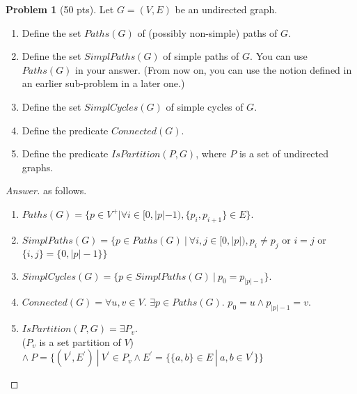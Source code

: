 \documentclass[11pt,a4paper,oneside,microtype,nokorean]{oblivoir}
\theoremstyle{definition}
\newtheorem{problem}{Problem}
\begin{document}
\begin{problem}[50 pts]
  Let $G = (V,E)$ be an undirected graph.

  \begin{enumerate}
  \item Define the set $Paths(G)$ of (possibly non-simple) paths of $G$.
  \item Define the set $SimplPaths(G)$ of simple paths of $G$.  You can use $Paths(G)$ in your
    answer.  (From now on, you can use the notion defined in an earlier sub-problem in a later one.)
  \item Define the set $SimplCycles(G)$ of simple cycles of $G$.
  \item Define the predicate $Connected(G)$.
  \item Define the predicate $IsPartition(P, G)$, where $P$ is a set of undirected graphs.
  \end{enumerate}
\end{problem}
\begin{proof}[Answer] as follows.

  \begin{enumerate}
  \item $Paths(G) = \{p \in V^+ | \forall i \in [0, |p| -1), \{p_i, p_{i+1}\} \in E \}.$
  \item $SimplPaths(G) = \{p \in Paths(G)\ |\ \forall{i,j} \in [0,|p|), p_i \neq p_j$ or $i=j$ or $\{i,j\} = \{0, |p|-1\}\}$
  \item $SimplCycles(G) = \{p \in SimplPaths(G)\ |\ p_0 = p_{|p|-1}\}.$
  \item $Connected(G) = \forall{u,v} \in V$. $\exists p \in Paths(G)$. $p_0 = u \land p_{|p|-1} = v$.
  \item $IsPartition(P,G) = \exists P_v$. \\ ($P_v$ is a set partition of $V$)\ $\land\ P = \{(V^{'},E^{'})\ |\ V^{'} \in P_v \land E^{'} = \{\{a,b\} \in E\ |\ a,b \in V^{'}\}\}$
  
  \end{enumerate}
\end{proof}
\end{document}
